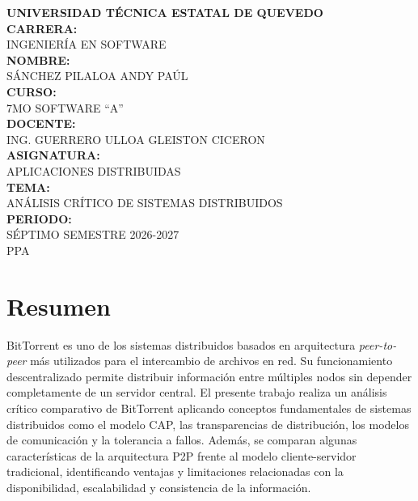 \documentclass[12pt]{article}
\begin{document}
\begin{titlepage}

\centering

{\Large \textbf{UNIVERSIDAD TÉCNICA ESTATAL DE QUEVEDO}}\\[0.3cm]
\textbf

{\large \textbf{CARRERA:}}\\[0.2cm]
INGENIERÍA EN SOFTWARE\\[1cm]

{\large \textbf{NOMBRE:}}\\[0.2cm]
SÁNCHEZ PILALOA ANDY PAÚL\\[1cm]

{\large \textbf{CURSO:}}\\[0.2cm]
7MO SOFTWARE ``A''\\[1cm]

{\large \textbf{DOCENTE:}}\\[0.2cm]
ING. GUERRERO ULLOA GLEISTON CICERON\\[1cm]

{\large \textbf{ASIGNATURA:}}\\[0.2cm]
APLICACIONES DISTRIBUIDAS\\[1cm]

{\large \textbf{TEMA:}}\\[0.2cm]
ANÁLISIS CRÍTICO DE SISTEMAS DISTRIBUIDOS\\[1cm]

{\large \textbf{PERIODO:}}\\[0.2cm]
SÉPTIMO SEMESTRE 2026-2027\\
PPA

\vfill

\end{titlepage}

\newpage

\tableofcontents
\thispagestyle{empty}

\newpage

\section*{Resumen}

BitTorrent es uno de los sistemas distribuidos basados en arquitectura \textit{peer-to-peer} más utilizados para el intercambio de archivos en red. Su funcionamiento descentralizado permite distribuir información entre múltiples nodos sin depender completamente de un servidor central. El presente trabajo realiza un análisis crítico comparativo de BitTorrent aplicando conceptos fundamentales de sistemas distribuidos como el modelo CAP, las transparencias de distribución, los modelos de comunicación y la tolerancia a fallos. Además, se comparan algunas características de la arquitectura P2P frente al modelo cliente-servidor tradicional, identificando ventajas y limitaciones relacionadas con la disponibilidad, escalabilidad y consistencia de la información.
\end{document}
